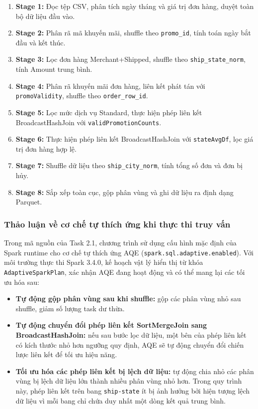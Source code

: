 \begin{enumerate}
    \item \textbf{Stage 1:} Đọc tệp CSV, phân tích ngày tháng và giá trị đơn hàng, duyệt toàn bộ dữ liệu đầu vào.
    \item \textbf{Stage 2:} Phân rã mã khuyến mãi, shuffle theo \texttt{promo\_id}, tính toán ngày bắt đầu và kết thúc.
    \item \textbf{Stage 3:} Lọc đơn hàng Merchant+Shipped, shuffle theo \texttt{ship\_state\_norm}, tính Amount trung bình.
    \item \textbf{Stage 4:} Phân rã khuyến mãi đơn hàng, liên kết phát tán với \texttt{promoValidity}, shuffle theo \texttt{order\_row\_id}.
    \item \textbf{Stage 5:} Lọc mức dịch vụ Standard, thực hiện phép liên kết BroadcastHashJoin với \texttt{validPromotionCounts}.
    \item \textbf{Stage 6:} Thực hiện phép liên kết BroadcastHashJoin với \texttt{stateAvgDf}, lọc giá trị đơn hàng hợp lệ.
    \item \textbf{Stage 7:} Shuffle dữ liệu theo \texttt{ship\_city\_norm}, tính tổng số đơn và đơn bị hủy.
    \item \textbf{Stage 8:} Sắp xếp toàn cục, gộp phân vùng và ghi dữ liệu ra định dạng Parquet.
\end{enumerate}

\subsubsection{Thảo luận về cơ chế tự thích ứng khi thực thi truy vấn}

Trong mã nguồn của Task 2.1, chương trình sử dụng cấu hình mặc định của Spark runtime cho cơ chế tự thích ứng AQE (\texttt{spark.sql.adaptive.enabled}). Với môi trường thực thi Spark 3.4.0, kế hoạch vật lý hiển thị từ khóa \texttt{AdaptiveSparkPlan}, xác nhận AQE đang hoạt động và có thể mang lại các tối ưu hóa sau:
\begin{itemize}
    \item \textbf{Tự động gộp phân vùng sau khi shuffle:} gộp các phân vùng nhỏ sau shuffle, giảm số lượng task dư thừa.
    \item \textbf{Tự động chuyển đổi phép liên kết SortMergeJoin sang BroadcastHashJoin:} nếu sau bước lọc dữ liệu, một bên của phép liên kết có kích thước nhỏ hơn ngưỡng quy định, AQE sẽ tự động chuyển đổi chiến lược liên kết để tối ưu hiệu năng.
    \item \textbf{Tối ưu hóa các phép liên kết bị lệch dữ liệu:} tự động chia nhỏ các phân vùng bị lệch dữ liệu lớn thành nhiều phân vùng nhỏ hơn. Trong quy trình này, phép liên kết trên bang \texttt{ship-state} ít bị ảnh hưởng bởi hiện tượng lệch dữ liệu vì mỗi bang chỉ chứa duy nhất một dòng kết quả trung bình.
\end{itemize}

